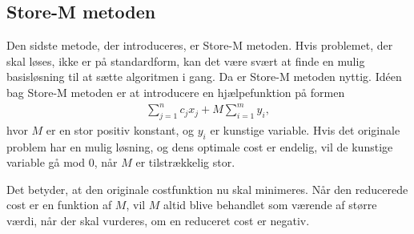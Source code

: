 \subsection{Store-M metoden}

Den sidste metode, der introduceres, er Store-M metoden. 
Hvis problemet, der skal løses, ikke er på standardform, kan det være svært at finde en mulig basisløsning til at sætte algoritmen i gang. 
Da er Store-M metoden nyttig.
Idéen bag Store-M metoden er at introducere en hjælpefunktion på formen
\begin{align*}
\sum\limits_{j=1}^n c_jx_j + M \sum\limits_{i=1}^m y_i,
\end{align*}
hvor $M$ er en stor positiv konstant, og $y_i$ er kunstige variable. 
Hvis det originale problem har en mulig løsning, og dens optimale cost er endelig, vil de kunstige variable gå mod $0$, når $M$ er tilstrækkelig stor. 

Det betyder, at den originale costfunktion nu skal minimeres. 
Når den reducerede cost er en funktion af $M$, vil $M$ altid blive behandlet som værende af større værdi, når der skal vurderes, om en reduceret cost er negativ. \\

